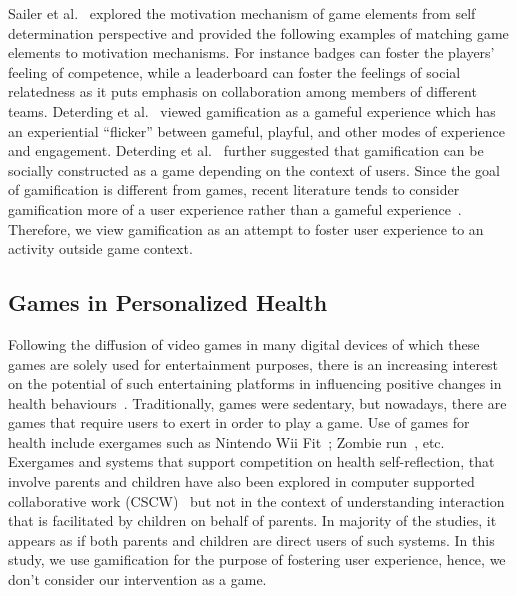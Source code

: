 \documentclass{sig-alternate}
\begin{document}
Sailer et al.~\cite{sailer2013:psychological} explored the motivation mechanism of game elements from self determination perspective and provided the following examples of matching game elements to motivation mechanisms. For instance badges can foster the players' feeling of competence, while a leaderboard can foster the feelings of social relatedness as it puts emphasis on collaboration among members of different teams. Deterding et al.~\cite{deterding2011game} viewed gamification as a gameful experience which has an experiential ``flicker'' between gameful, playful, and other modes of experience and engagement. Deterding et al.~\cite{deterding2011game} further suggested that gamification can be socially constructed as a game depending on the context of users. Since the goal of gamification is different from games, recent literature  tends to consider gamification more of a user experience rather than a gameful experience~\cite{seaborn2015:gamification}. Therefore, we view gamification as an attempt to foster user experience to an activity outside game context.

\subsection{Games in Personalized Health}  
Following the diffusion of video games in many digital devices of which these games are solely used for entertainment purposes, there is an increasing interest on the potential of such entertaining platforms in influencing positive changes in health behaviours~\cite{king2013gamification}. Traditionally, games were sedentary, but nowadays, there are games that require users to exert in order to play a game. Use of games for health include exergames such as Nintendo Wii Fit~\cite{gobel2010serious}; Zombie run~\cite{witkowski2013running}, etc. Exergames and systems that support competition on health self-reflection, that involve  parents and children have also been explored in computer supported collaborative work (CSCW)~\cite{grimes2009toward,saksono2015spaceship} but not in the context of understanding interaction that is facilitated by children on behalf of parents. In majority of the studies, it appears as if both parents and children are direct users of such systems. In this study, we use gamification for the purpose of fostering user experience, hence, we don't consider our intervention as a game.
\end{document}
